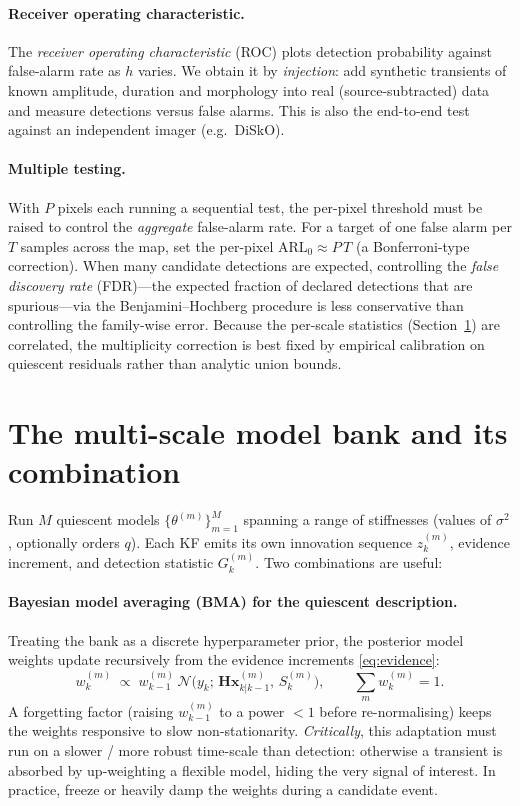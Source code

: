 \documentclass[11pt]{article}
\newcommand{\Norm}{\mathcal{N}}
\begin{document}
\paragraph{Receiver operating characteristic.}
The \emph{receiver operating characteristic} (ROC) plots detection probability against
false-alarm rate as $h$ varies. We obtain it by \emph{injection}: add synthetic
transients of known amplitude, duration and morphology into real
(source-subtracted) data and measure detections versus false alarms. This is also the
end-to-end test against an independent imager (e.g.\ DiSkO).

\paragraph{Multiple testing.}
With $P$ pixels each running a sequential test, the per-pixel threshold must be raised
to control the \emph{aggregate} false-alarm rate. For a target of one false alarm per
$T$ samples across the map, set the per-pixel $\mathrm{ARL}_0\approx P\,T$ (a
Bonferroni-type correction). When many candidate detections are expected, controlling
the \emph{false discovery rate} (FDR)---the expected fraction of declared detections
that are spurious---via the Benjamini--Hochberg procedure is less conservative than
controlling the family-wise error. Because the per-scale statistics
(Section~\ref{sec:bank}) are correlated, the multiplicity correction is best fixed by
empirical calibration on quiescent residuals rather than analytic union bounds.

\section{The multi-scale model bank and its combination}
\label{sec:bank}

Run $M$ quiescent models $\{\theta^{(m)}\}_{m=1}^{M}$ spanning a range of stiffnesses
(values of $\sigma^2$, optionally orders $q$). Each KF emits its own innovation
sequence $z_k^{(m)}$, evidence increment, and detection statistic $G_k^{(m)}$. Two
combinations are useful:

\paragraph{Bayesian model averaging (BMA) for the quiescent description.}
Treating the bank as a discrete hyperparameter prior, the posterior model weights
update recursively from the evidence increments \eqref{eq:evidence}:
\begin{equation}
  w_k^{(m)} \;\propto\; w_{k-1}^{(m)}\,
  \Norm\!\big(y_k;\,\bm{H}\bm{x}^{(m)}_{k|k-1},\,S_k^{(m)}\big),
  \qquad \sum_m w_k^{(m)}=1 .
\end{equation}
A forgetting factor (raising $w_{k-1}^{(m)}$ to a power $<1$ before re-normalising)
keeps the weights responsive to slow non-stationarity. \emph{Critically}, this
adaptation must run on a slower / more robust time-scale than detection: otherwise a
transient is absorbed by up-weighting a flexible model, hiding the very signal of
interest. In practice, freeze or heavily damp the weights during a candidate event.
\end{document}
